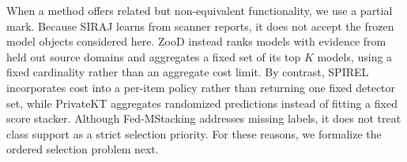 When a method offers related but non-equivalent functionality, we use a partial
mark. Because SIRAJ learns from scanner reports, it does not accept the frozen
model objects considered here. ZooD instead ranks models with evidence from
held out source domains and aggregates a fixed set of its top $K$ models, using
a fixed cardinality rather than an aggregate cost limit. By contrast, SPIREL
incorporates cost into a per-item policy rather than returning one fixed
detector set, while PrivateKT aggregates randomized predictions instead of
fitting a fixed score stacker. Although Fed-MStacking addresses missing labels,
it does not treat class support as a strict selection priority. For these
reasons, we formalize the ordered selection problem next.
